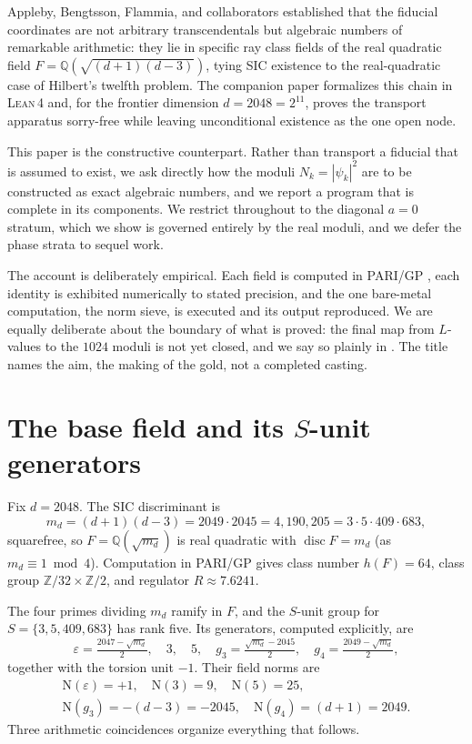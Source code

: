 \documentclass[12pt,a4paper]{article}
\newcommand{\Fd}{F}
\newcommand{\md}{m_d}
\newcommand{\Norm}{\mathrm{N}}
\newcommand{\Lean}{\textsc{Lean\,4}}
\begin{document}
Appleby, Bengtsson, Flammia, and collaborators
\cite{Appleby2013,Appleby2017,AFMY2020} established that the fiducial
coordinates are not arbitrary transcendentals but algebraic numbers of
remarkable arithmetic: they lie in specific ray class fields of the real
quadratic field $\Fd = \mathbb{Q}(\sqrt{(d+1)(d-3)})$, tying SIC existence to
the real-quadratic case of Hilbert's twelfth problem. The companion paper
\cite{StarkHilbert12} formalizes this chain in \Lean{} and, for the frontier
dimension $d=2048=2^{11}$, proves the transport apparatus sorry-free while
leaving unconditional existence as the one open node.

This paper is the constructive counterpart. Rather than transport a fiducial
that is assumed to exist, we ask directly how the moduli
$N_k = |\psi_k|^2$ are to be constructed as exact algebraic numbers, and we
report a program that is complete in its components. We restrict throughout to
the diagonal $a=0$ stratum, which we show is governed entirely by the real
moduli, and we defer the phase strata to sequel work.

The account is deliberately empirical. Each field is computed in PARI/GP
\cite{PARI}, each identity is exhibited numerically to stated precision, and the
one bare-metal computation, the norm sieve, is executed and its output
reproduced. We are equally deliberate about the boundary of what is proved: the
final map from $L$-values to the $1024$ moduli is not yet closed, and we say so
plainly in . The title names the aim, the making of the gold,
not a completed casting.

\section{The base field and its $S$-unit generators}
\label{sec:base}

Fix $d=2048$. The SIC discriminant is
\[
\md = (d+1)(d-3) = 2049\cdot 2045 = 4{,}190{,}205 = 3\cdot 5\cdot 409\cdot 683,
\]
squarefree, so $\Fd=\mathbb{Q}(\sqrt{\md})$ is real quadratic with
$\operatorname{disc}\Fd = \md$ (as $\md\equiv 1 \bmod 4$). Computation in PARI/GP
gives class number $h(\Fd)=64$, class group $\mathbb{Z}/32\times\mathbb{Z}/2$,
and regulator $R \approx 7.6241$.

The four primes dividing $\md$ ramify in $\Fd$, and the $S$-unit group for
$S = \{3,5,409,683\}$ has rank five. Its generators, computed explicitly, are
\[
\varepsilon = \tfrac{2047 - \sqrt{\md}}{2},\quad
3,\quad 5,\quad
g_3 = \tfrac{\sqrt{\md}-2045}{2},\quad
g_4 = \tfrac{2049-\sqrt{\md}}{2},
\]
together with the torsion unit $-1$. Their field norms are
\[
\begin{gathered}
\Norm(\varepsilon)=+1,\quad
\Norm(3)=9,\quad
\Norm(5)=25,\\
\Norm(g_3)=-(d-3)=-2045,\quad
\Norm(g_4)=(d+1)=2049 .
\end{gathered}
\]
Three arithmetic coincidences organize everything that follows.
\end{document}
